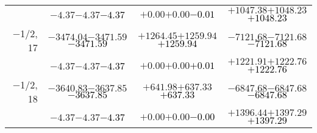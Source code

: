 \documentclass[compress]{beamer}
\begin{document}
\begin{frame}
{\begin{tabular}{r | c | c | c}
           & $-4.37$\hspace{0.1 cm}$-4.37$\hspace{0.1 cm}\textcolor{black}{$-4.37$} & $+0.00$\hspace{0.1 cm}$+0.00$\hspace{0.1 cm}\textcolor{black}{$-0.01$} & $+1047.38$\hspace{0.1 cm}$+1048.23$\hspace{0.1 cm}\textcolor{black}{$+1048.23$} \\
$-$1/2, 17 & $-3474.04$\hspace{0.1 cm}$-3471.59$\hspace{0.1 cm}\textcolor{black}{$-3471.59$} & $+1264.45$\hspace{0.1 cm}$+1259.94$\hspace{0.1 cm}\textcolor{black}{$+1259.94$} & $-7121.68$\hspace{0.1 cm}$-7121.68$\hspace{0.1 cm}\textcolor{black}{$-7121.68$} \\
           & $-4.37$\hspace{0.1 cm}$-4.37$\hspace{0.1 cm}\textcolor{black}{$-4.37$} & $+0.00$\hspace{0.1 cm}$+0.00$\hspace{0.1 cm}\textcolor{black}{$+0.01$} & $+1221.91$\hspace{0.1 cm}$+1222.76$\hspace{0.1 cm}\textcolor{black}{$+1222.76$} \\
$-$1/2, 18 & $-3640.83$\hspace{0.1 cm}$-3637.85$\hspace{0.1 cm}\textcolor{black}{$-3637.85$} & $+641.98$\hspace{0.1 cm}$+637.33$\hspace{0.1 cm}\textcolor{black}{$+637.33$} & $-6847.68$\hspace{0.1 cm}$-6847.68$\hspace{0.1 cm}\textcolor{black}{$-6847.68$} \\
           & $-4.37$\hspace{0.1 cm}$-4.37$\hspace{0.1 cm}\textcolor{black}{$-4.37$} & $+0.00$\hspace{0.1 cm}$+0.00$\hspace{0.1 cm}\textcolor{black}{$-0.00$} & $+1396.44$\hspace{0.1 cm}$+1397.29$\hspace{0.1 cm}\textcolor{black}{$+1397.29$} \\
\end{tabular}}
\end{frame}
\end{document}
